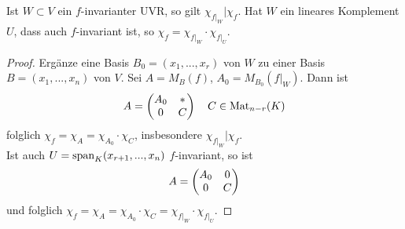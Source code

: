 \begin{lemma}
	Ist $W\subset V$ ein $f$-invarianter UVR, so gilt $\chi_{f\vert_W}\vert \chi_f$. Hat $W$ ein lineares Komplement $U$, dass auch $f$-invariant ist, so $\chi_f=\chi_{f\vert_W}\cdot \chi_{f\vert_U}$.
\end{lemma}
\begin{proof}
	Ergänze eine Basis $B_0=(x_1,...,x_r)$ von $W$ zu einer Basis $B=(x_1,...,x_n)$ von $V$. Sei $A=M_B(f)$, $A_0=M_{B_0}(f\vert_W)$. Dann ist 
	\begin{align}
		A=\begin{pmatrix}A_0&*\\0&C\end{pmatrix}\quad C\in\operatorname{Mat}_{n-r}(K)\notag
	\end{align}
	folglich $\chi_f=\chi_A=\chi_{A_0}\cdot \chi_C$, insbesondere $\chi_{f\vert_W}\vert\chi_f$.\\
	Ist auch $U=\operatorname{span}_K(x_{r+1},...,x_n)$ $f$-invariant, so ist 
	\begin{align}
		A=\begin{pmatrix}A_0&0\\0&C\end{pmatrix}\notag
	\end{align}
	und folglich $\chi_f=\chi_A=\chi_{A_0}\cdot\chi_C=\chi_{f\vert_W}\cdot\chi_{f\vert_U}$.
\end{proof}


